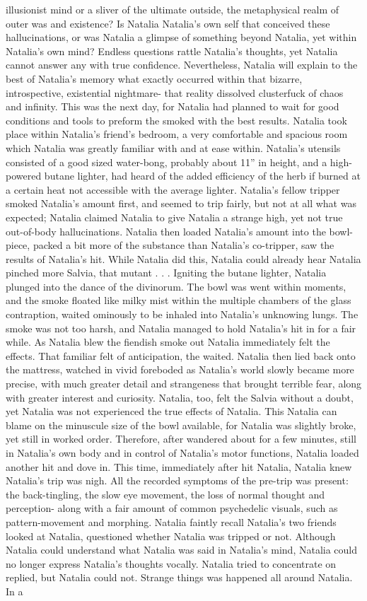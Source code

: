 \documentclass[12pt]{book}
\begin{document}
illusionist mind or a sliver of the ultimate outside, the metaphysical realm of outer was and existence? Is Natalia Natalia's own self that conceived these hallucinations, or was Natalia a glimpse of something beyond Natalia, yet within Natalia's own mind? Endless questions rattle Natalia's thoughts, yet Natalia cannot answer any with true confidence. Nevertheless, Natalia will explain to the best of Natalia's memory what exactly occurred within that bizarre, introspective, existential nightmare- that reality dissolved clusterfuck of chaos and infinity. This was the next day, for Natalia had planned to wait for good conditions and tools to preform the smoked with the best results. Natalia took place within Natalia's friend's bedroom, a very comfortable and spacious room which Natalia was greatly familiar with and at ease within. Natalia's utensils consisted of a good sized water-bong, probably about 11'' in height, and a high-powered butane lighter, had heard of the added efficiency of the herb if burned at a certain heat not accessible with the average lighter. Natalia's fellow tripper smoked Natalia's amount first, and seemed to trip fairly, but not at all what was expected; Natalia claimed Natalia to give Natalia a strange high, yet not true out-of-body hallucinations. Natalia then loaded Natalia's amount into the bowl-piece, packed a bit more of the substance than Natalia's co-tripper, saw the results of Natalia's hit. While Natalia did this, Natalia could already hear Natalia pinched more Salvia, that mutant . . .  Igniting the butane lighter, Natalia plunged into the dance of the divinorum. The bowl was went within moments, and the smoke floated like milky mist within the multiple chambers of the glass contraption, waited ominously to be inhaled into Natalia's unknowing lungs. The smoke was not too harsh, and Natalia managed to hold Natalia's hit in for a fair while. As Natalia blew the fiendish smoke out Natalia immediately felt the effects. That familiar felt of anticipation, the waited. Natalia then lied back onto the mattress, watched in vivid foreboded as Natalia's world slowly became more precise, with much greater detail and strangeness that brought terrible fear, along with greater interest and curiosity. Natalia, too, felt the Salvia without a doubt, yet Natalia was not experienced the true effects of Natalia. This Natalia can blame on the minuscule size of the bowl available, for Natalia was slightly broke, yet still in worked order. Therefore, after wandered about for a few minutes, still in Natalia's own body and in control of Natalia's motor functions, Natalia loaded another hit and dove in. This time, immediately after hit Natalia, Natalia knew Natalia's trip was nigh. All the recorded symptoms of the pre-trip was present: the back-tingling, the slow eye movement, the loss of normal thought and perception- along with a fair amount of common psychedelic visuals, such as pattern-movement and morphing. Natalia faintly recall Natalia's two friends looked at Natalia, questioned whether Natalia was tripped or not. Although Natalia could understand what Natalia was said in Natalia's mind, Natalia could no longer express Natalia's thoughts vocally. Natalia tried to concentrate on replied, but Natalia could not. Strange things was happened all around Natalia. In a 
\end{document}
